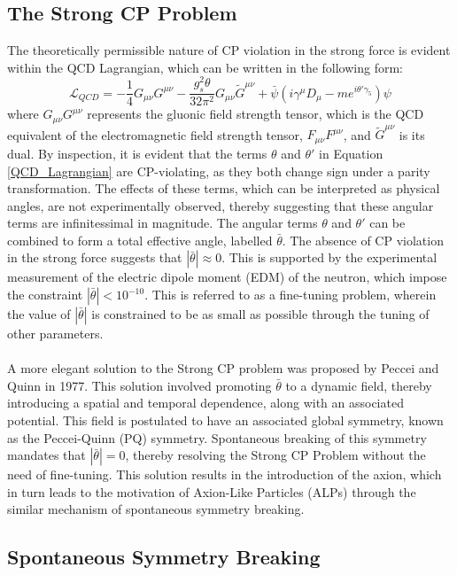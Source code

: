 \subsection{The Strong CP Problem}\label{StrongCPProb}
The theoretically permissible nature of CP violation in the strong force is evident within the QCD Lagrangian, which can be written in the following form:
\begin{equation}\label{QCD_Lagrangian}
    \mathcal{L}_{QCD} = -\frac{1}{4}G_{\mu\nu}G^{\mu\nu}-\frac{g_{s}^{2}\theta}{32\pi^{2}}G_{\mu\nu}\tilde{G}^{\mu\nu}+\bar{\psi}(i\gamma^{\mu}D_{\mu}-me^{i\theta'\gamma_{5}})\psi
\end{equation}
where $G_{\mu\nu}G^{\mu\nu}$ represents the gluonic field strength tensor, which is the QCD equivalent of the electromagnetic field strength tensor, $F_{\mu\nu}F^{\mu\nu}$, and $\tilde{G}^{\mu\nu}$ is its dual. By inspection, it is evident that the terms $\theta$ and $\theta'$ in Equation \ref{QCD_Lagrangian} are CP-violating, as they both 
change sign under a parity transformation. The effects of these terms, which can be interpreted as physical angles, are not experimentally observed, thereby suggesting that these angular terms are infinitessimal in magnitude. The angular terms $\theta$ and $\theta'$ can be combined to form a total effective angle, labelled $\bar{\theta}$. The absence
of CP violation in the strong force suggests that $|\bar{\theta}|\approx 0$. This is supported by the experimental measurement of the electric dipole moment (EDM) of the neutron, which impose the constraint $|\bar{\theta}| < 10^{-10}$. This is referred to as a fine-tuning problem, wherein the value of $|\bar{\theta}|$ is constrained to be as small as possible
through the tuning of other parameters.\\
\\
A more elegant solution to the Strong CP problem was proposed by Peccei and Quinn in 1977. This solution involved promoting $\bar{\theta}$ to a dynamic field, thereby introducing a spatial and temporal dependence, along with an associated
potential. This field is postulated to have an associated global symmetry, known as the Peccei-Quinn (PQ) symmetry. Spontaneous breaking of this symmetry mandates that $|\bar{\theta}| = 0$, thereby resolving the Strong CP Problem without the need of fine-tuning. This solution 
results in the introduction of the axion, which in turn leads to the motivation of Axion-Like Particles (ALPs) through the similar mechanism of spontaneous symmetry breaking.
\subsection{Spontaneous Symmetry Breaking}
